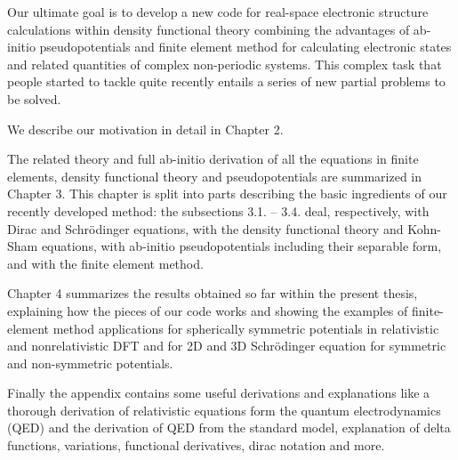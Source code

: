 Our ultimate goal is to develop a new code for real-space electronic structure
calculations within density functional theory combining the advantages
of ab-initio pseudopotentials and finite element method for calculating
electronic states and related quantities of complex non-periodic systems.
This complex task that people started to tackle quite recently
\cite{pask1, pask2, ortiz1, ortiz2}
entails a series of new partial problems to be solved.

We describe our motivation in detail in Chapter 2.

The related theory and full ab-initio derivation of all the equations
in finite elements, density functional theory and pseudopotentials
are summarized in Chapter 3.
This chapter is split into parts describing the basic ingredients of our
recently developed method: the subsections 3.1. -- 3.4. deal, respectively,
with Dirac and Schr\"odinger equations, with the density functional theory and
Kohn-Sham equations, with ab-initio pseudopotentials including their separable
form, and with the finite element method.


Chapter 4 summarizes the results obtained so far within the
present thesis, explaining how the pieces of our code works and showing
the examples of finite-element method applications for spherically symmetric
potentials in relativistic and nonrelativistic DFT and for 2D and 3D
Schr\"odinger equation for symmetric and non-symmetric potentials.

Finally the appendix contains some useful derivations and explanations
like a thorough derivation of relativistic equations form the quantum
electrodynamics (QED) and the derivation of QED from the standard model,
explanation of delta functions, variations, functional derivatives,
dirac notation and more.
